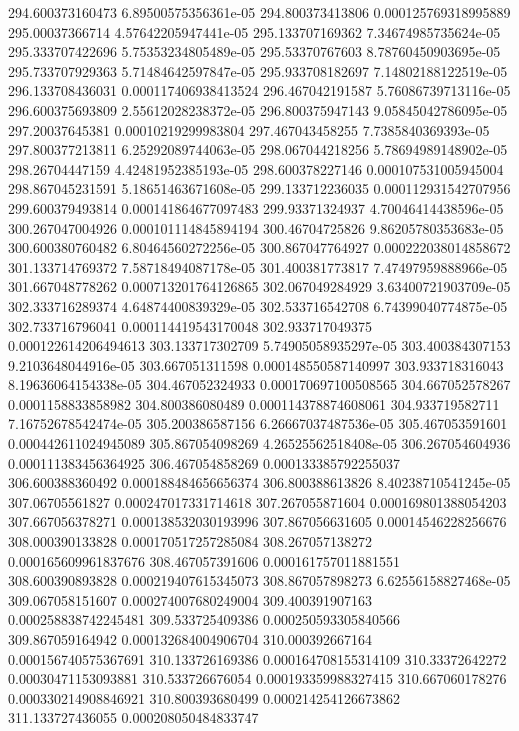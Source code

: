 {294.600373160473 6.89500575356361e-05
294.800373413806 0.000125769318995889
295.00037366714 4.57642205947441e-05
295.133707169362 7.34674985735624e-05
295.333707422696 5.75353234805489e-05
295.53370767603 8.78760450903695e-05
295.733707929363 5.71484642597847e-05
295.933708182697 7.14802188122519e-05
296.133708436031 0.000117406938413524
296.467042191587 5.76086739713116e-05
296.600375693809 2.55612028238372e-05
296.800375947143 9.05845042786095e-05
297.20037645381 0.00010219299983804
297.467043458255 7.7385840369393e-05
297.800377213811 6.25292089744063e-05
298.067044218256 5.78694989148902e-05
298.26704447159 4.42481952385193e-05
298.600378227146 0.000107531005945004
298.867045231591 5.18651463671608e-05
299.133712236035 0.000112931542707956
299.600379493814 0.000141864677097483
299.93371324937 4.70046414438596e-05
300.267047004926 0.000101114845894194
300.46704725826 9.86205780353683e-05
300.600380760482 6.80464560272256e-05
300.867047764927 0.000222038014858672
301.133714769372 7.58718494087178e-05
301.400381773817 7.47497959888966e-05
301.667048778262 0.000713201764126865
302.067049284929 3.63400721903709e-05
302.333716289374 4.64874400839329e-05
302.533716542708 6.74399040774875e-05
302.733716796041 0.000114419543170048
302.933717049375 0.000122614206494613
303.133717302709 5.74905058935297e-05
303.400384307153 9.2103648044916e-05
303.667051311598 0.000148550587140997
303.933718316043 8.19636064154338e-05
304.467052324933 0.000170697100508565
304.667052578267 0.0001158833858982
304.800386080489 0.000114378874608061
304.933719582711 7.16752678542474e-05
305.200386587156 6.26667037487536e-05
305.467053591601 0.000442611024945089
305.867054098269 4.26525562518408e-05
306.267054604936 0.000111383456364925
306.467054858269 0.000133385792255037
306.600388360492 0.000188484656656374
306.800388613826 8.40238710541245e-05
307.06705561827 0.000247017331714618
307.267055871604 0.000169801388054203
307.667056378271 0.000138532030193996
307.867056631605 0.00014546228256676
308.000390133828 0.000170517257285084
308.267057138272 0.000165609961837676
308.467057391606 0.000161757011881551
308.600390893828 0.000219407615345073
308.867057898273 6.62556158827468e-05
309.067058151607 0.000274007680249004
309.400391907163 0.000258838742245481
309.533725409386 0.000250593305840566
309.867059164942 0.000132684004906704
310.000392667164 0.000156740575367691
310.133726169386 0.000164708155314109
310.33372642272 0.00030471153093881
310.533726676054 0.000193359988327415
310.667060178276 0.000330214908846921
310.800393680499 0.000214254126673862
311.133727436055 0.000208050484833747
}

